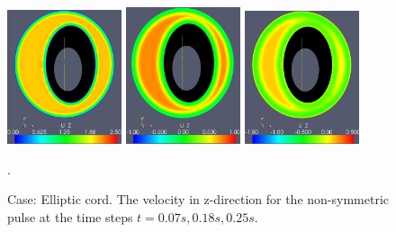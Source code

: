 \begin{figure}\begin{center}
\includegraphics[width=0.3\textwidth]{chapters/haughton/eps/pulse_f1_08_elliptic_sysmax_nmb7.eps}
\includegraphics[width=0.3\textwidth]{chapters/haughton/eps/pulse_f1_08_elliptic_sysdia_nmb18.eps}
\includegraphics[width=0.3\textwidth]{chapters/haughton/eps/pulse_f1_08_elliptic_diamin1_nmb25.eps}
\caption{Case: Elliptic cord. The velocity in z-direction for the non-symmetric pulse at the time steps $t=0.07s, 0.18s, 0.25s$.}
\label{fig:case3}. 
\end{center}\end{figure}



